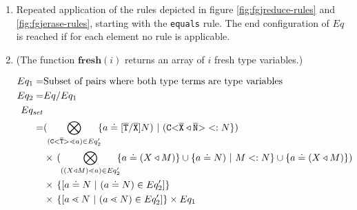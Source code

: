\begin{enumerate}
\item Repeated application of the rules depicted in figure \ref{fig:fgjreduce-rules} and \ref{fig:fgjerase-rules},
starting with the \texttt{equals} rule.
The end configuration of $Eq$ is reached if for each element no rule is applicable.

\item
(The function $\textbf{fresh}(i)$ returns an array of $i$ fresh type variables.)

\begin{align*}
Eq_1 =& \text{Subset of pairs where both type terms are type variables}\\
Eq_2 =& Eq / Eq_1 \\
Eq_{set}\\ 
    = 
    & %
    (\displaystyle{\bigotimes_{(\exptype{C}{\overline{T}} \lessdot a) \in Eq'_2}}\!\!
    \set{a \doteq [\ol{T}/\ol{X}]N ) \ | \ (\exptype{C}{\overline{X} \triangleleft \ol{N}} <: N})\\
    & \times\, 
      (\displaystyle{\bigotimes_{((X \triangleleft M)\lessdot a) \in Eq'_2}}\!\!
      \set{a \doteq (X \triangleleft M)} \cup
      \set{a \doteq N ) \ | \ M <: N } \cup \set{a \doteq (X \triangleleft M)})\\
      & \times\, \set{[a \doteq N \ | \  (a \doteq N) \in Eq'_2]} \\
      & \times\, \set{[a \lessdot N \ | \  (a \lessdot N) \in Eq'_2]} \times Eq_1 \\
\end{align*}


\end{enumerate}
